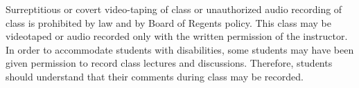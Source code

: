 Surreptitious or covert video-taping of class or unauthorized audio recording of
class is prohibited by law and by Board of Regents policy. This class may be
videotaped or audio recorded only with the written permission of the instructor.
In order to accommodate students with disabilities, some students may have been
given permission to record class lectures and discussions. Therefore, students
should understand that their comments during class may be recorded.
